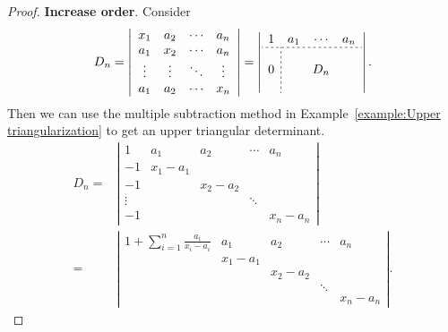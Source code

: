 \documentclass{report}
\theoremstyle{nonumberplain}
\newtheorem{proof}{Proof.}
\begin{document}
\begin{proof}
	\textbf{Increase order}. Consider
	\begin{equation*}
		\begin{aligned}
			D_{n}=\left|\begin{array}{cccc}
				x_{1}  & a_{2}  & \cdots & a_{n}  \\
				a_{1}  & x_{2}  & \cdots & a_{n}  \\
				\vdots & \vdots & \ddots & \vdots \\
				a_{1}  & a_{2}  & \cdots & x_{n}
			\end{array}\right|=
			\left|\begin{array}{c;{2pt/2pt}ccc}
				1           & a_{1} & \cdots & a_{n} \\\hdashline[2pt/2pt]
				            &       &        &       \\
				0           &       & D_n    &       \\
				\phantom{a} &       &        &
			\end{array}\right|.
		\end{aligned}
	\end{equation*}
	Then we can use the multiple subtraction method in Example~\ref{example:Upper triangularization} to get an upper triangular determinant.
	\begin{equation*}
		\begin{aligned}
			D_{n}= & \left|\begin{array}{ccccc}
				1      & a_{1}     & a_2     & \cdots & a_{n}   \\
				-1     & x_1-a_{1} &         &        &         \\
				-1     &           & x_2-a_2 &        &         \\
				\vdots &           &         & \ddots &         \\
				-1     &           &         &        & x_n-a_n
			\end{array}\right|  \\
			=      & \left|\begin{array}{ccccc}
				1+\sum_{i=1}^{n} \frac{a_{i}}{x_{i}-a_{i}} & a_{1}     & a_2     & \cdots & a_{n}   \\
				                                           & x_1-a_{1} &         &        &         \\
				                                           &           & x_2-a_2 &        &         \\
				                                           &           &         & \ddots &         \\
				                                           &           &         &        & x_n-a_n
			\end{array}\right|.
		\end{aligned}
	\end{equation*}
\end{proof}
\end{document}
